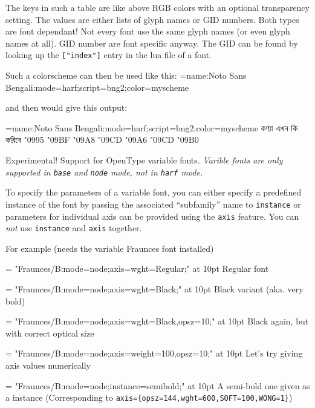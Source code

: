           The keys in such a table are like above RGB colors with an optional transparency setting.
          The values are either lists of glyph names or GID numbers.
          Both types are font dependant! Not every font use the same
          glyph names (or even glyph names at all). GID number are font specific anyway. The GID can be found
          by looking up the \verb+["index"]+ entry in the lua file of a font.

          Such a colorscheme can then be used like this:
          \beginlisting
          \font\test={name:Noto Sans Bengali:mode=harf;script=bng2;color=myscheme}
          \endlisting

          and then would give this output:


          {\font\test={name:Noto Sans Bengali:mode=harf;script=bng2;color=myscheme}\test
           কণ্যা এখন কি করিবে
           \char"0995 \char"09BF
           \char"09A8 \char"09CD \char"09A6
           \char"09CD \char"09B0}

  \endaltitem


    Experimental! Support for OpenType variable fonts. \emph{Varible fonts are only
    supported in \texttt{base} and \texttt{node} mode, not in \texttt{harf}
    mode.}

    To specify the parameters of a variable font, you can either specify a
    predefined instance of the font by passing the associated
    \enquote{subfamily} name to \texttt{instance} or parameters for individual
    axis can be provided using the \texttt{axis} feature. You can \emph{not}
    use \texttt{instance} and \texttt{axis} together.

    For example (needs the variable Fraunces font installed)

         \beginlisting
           \def\fraunces#1#2{%
             \font\varfont = "Fraunces/B:mode=node;#1;" at #2pt\varfont
           }
           \fraunces{axis={wght=Regular}}{10}Regular font\par
           \fraunces{axis={wght=Black}}{10}Black variant (aka. very bold)\par
           \fraunces{axis={wght=Black,opsz=10}}{10}Black again, but with
           correct optical size\par
           \fraunces{axis={weight=100,opsz=10}}{10}Let's try giving axis values
           numerically\par
           \fraunces{instance=semibold}{10}A semi-bold one given as
           a instance
           (Corresponding to
           \verb|axis={opsz=144,wght=600,SOFT=100,WONG=1}|)\par
         \endlisting

